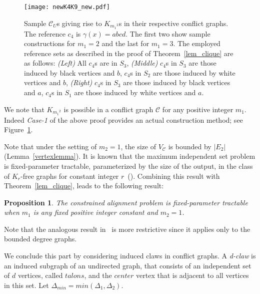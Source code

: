 \documentclass[final]{dmtcs-episciences}
\newtheorem{proposition}[theorem]{Proposition}
\begin{document}
\begin{figure}[t]	   
\begin{center}	   
\hspace*{-.3cm}
\texttt{[image: newK4K9\_new.pdf]} 
\caption{\sf Sample $\mathcal{C}_U$s giving rise to $K_{{m_1}^2}$s in their
respective conflict graphs.
The reference $c_4$ is $\gamma(x)=abcd$. The first two  show sample constructions for $m_1=2$ and the last for $m_1=3$.
The employed reference sets as
described in the proof of Theorem~\ref{lem_clique} are as follows:  \emph{ (Left)} All $c_4$s are in $S_3$, 
 \emph{ (Middle)} $c_4$s in $S_3$ are those induced by black vertices and $b$, $c_4$s in $S_2$ are those induced by 
white vertices and $b$, 
 \emph{ (Right)} $c_4$s in $S_3$ are those induced by black vertices and $a$, $c_4$s in $S_1$ are those induced by 
white vertices and $a$. 
} 
\label{cliquesample}	   
\end{center}	   
\end{figure}  


We note that $K_{{m_1}^2}$ is possible in a conflict graph $\mathcal{C}$ 
for any positive integer $m_1$. Indeed  \emph{ Case-1} of the above proof provides
an actual construction method; see Figure~\ref{cliquesample}.


Note that under the setting of $m_2=1$, the size of $V_\mathcal{C}$ is bounded by $|E_2|$ (Lemma~\ref{vertexlemma}).
It is known that 
the maximum independent set problem is fixed-parameter tractable, parameterized by the size of the 
output, in the class of $K_r$-free 
graphs for constant integer $r$~(\citet{DBLP:conf/swat/RamanS06,DabrowskiLMR12}). Combining this result
with Theorem~\ref{lem_clique}, leads to the following result:

\begin{proposition} 
The constrained alignment problem is fixed-parameter tractable when $m_1$ is any fixed 
positive integer constant and 
$m_2=1$. 
\label{cor14}
\end{proposition} 

Note that the analogous result in~\citet{Fertin200990} is more restrictive since it applies only to the bounded degree
graphs.



We conclude this part by considering induced claws in conflict graphs. A  \emph{ d-claw} is an induced subgraph of an undirected graph, 
that consists of an independent set of $d$ vertices, called $talons$, and 
the $center$ vertex that is adjacent to all vertices in this set. 
Let $\Delta_{min}=min(\Delta_1, \Delta_2)$.
\end{document}
